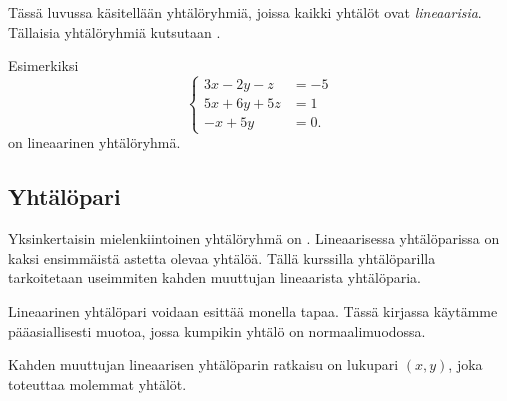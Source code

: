 Tässä luvussa käsitellään yhtälöryhmiä, joissa kaikki yhtälöt ovat \emph{lineaarisia}. 
Tällaisia yhtälöryhmiä kutsutaan .

Esimerkiksi
\[
\left\{
\begin{aligned}
3x-2y-z&= -5 \\
5x+6y+5z&= 1 \\
-x+5y&= 0.
\end{aligned}
\right.
\]
on lineaarinen yhtälöryhmä. 


\subsection*{Yhtälöpari}

Yksinkertaisin mielenkiintoinen yhtälöryhmä on
.
Lineaarisessa yhtälöparissa on kaksi ensimmäistä astetta olevaa yhtälöä.
Tällä kurssilla yhtälöparilla tarkoitetaan useimmiten kahden muuttujan lineaarista yhtälöparia.

Lineaarinen yhtälöpari voidaan esittää monella tapaa. Tässä
kirjassa käytämme pääasiallisesti muotoa, jossa kumpikin yhtälö on normaalimuodossa.


Kahden muuttujan lineaarisen yhtälöparin ratkaisu on lukupari $(x, y)$, joka toteuttaa molemmat yhtälöt.

